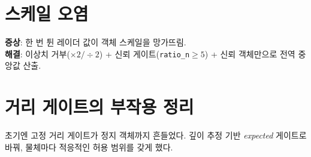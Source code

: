 \section{스케일 오염}
\textbf{증상}: 한 번 튄 레이더 값이 객체 스케일을 망가뜨림.\\
\textbf{해결}: 이상치 거부($\times2/\div2$) + 신뢰 게이트(\texttt{ratio\_n}$\ge5$) +
신뢰 객체만으로 전역 중앙값 산출.

\section{거리 게이트의 부작용 정리}
초기엔 고정 거리 게이트가 정지 객체까지 흔들었다. 깊이 추정 기반
\emph{expected} 게이트로 바꿔, 물체마다 적응적인 허용 범위를 갖게 했다.
